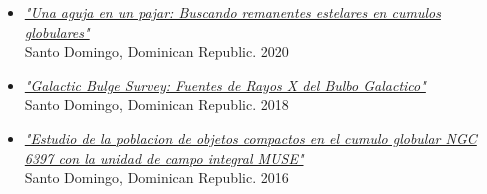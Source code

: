\documentclass[letterpaper,10pt]{article}
\begin{document}
\begin{itemize}[label=$\blacktriangleright$]


    \item \textit{\href{https://manuelpm.me/AstrodomJulio2020/}{"Una aguja en un pajar: Buscando remanentes estelares en cumulos globulares"}} \\ Santo Domingo, Dominican Republic. 2020


	\item \textit{\href{http://manuelpm.me/AstrodomGBStalk/}{"Galactic Bulge Survey: Fuentes de Rayos X del Bulbo Galactico"}} \\ Santo Domingo, Dominican Republic. 2018



	\item \textit{\href{http://manuelpm.me/Astrodomtalk/}{"Estudio de la poblacion de objetos compactos en el cumulo globular NGC 6397 con la unidad de campo integral MUSE"}} \\Santo Domingo, Dominican Republic. 2016

\end{itemize}






%
%
\end{document}

